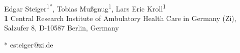 \documentclass[10pt,letterpaper]{article}
\begin{document}
\vspace*{0.2in}

\begin{flushleft}
{\Large
\textbf{} %
}
\newline
\\
Edgar Steiger\textsuperscript{1*},
Tobias Mußgnug\textsuperscript{1},
Lars Eric Kroll\textsuperscript{1}%
\\
\bigskip
\textbf{1} Central Research Institute of Ambulatory Health Care in Germany (Zi),
Salzufer 8, D-10587 Berlin, Germany
\\
\bigskip

% 
%





* esteiger@zi.de

\end{flushleft}
\end{document}
